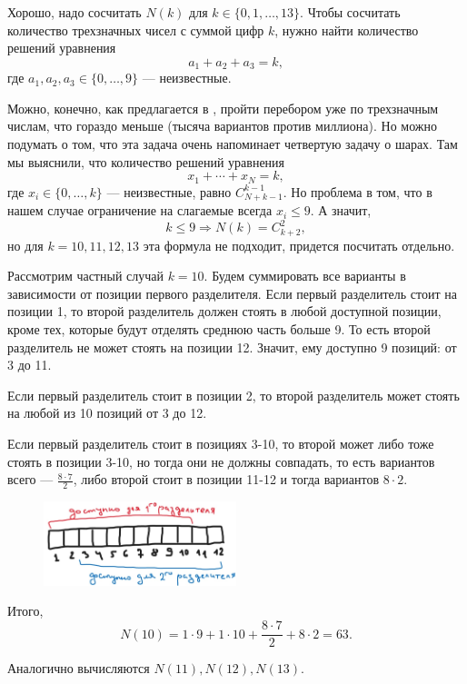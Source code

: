 \documentclass[a4paper,12pt]{article}
\renewcommand{\le}{\leqslant}
\newcounter{th-counter}
\begin{document}
Хорошо, надо сосчитать $N(k)$ для $k \in \{0, 1, \ldots, 13\}$. Чтобы сосчитать количество трехзначных чисел с суммой цифр $k$, нужно найти количество решений уравнения
\[
a_1 + a_2 + a_3 = k,
\]
где $a_1, a_2, a_3 \in \{0, \ldots, 9\}$ --- неизвестные.

Можно, конечно, как предлагается в \cite{OneMoreTimeAboutHappyTickets}, пройти перебором уже по трехзначным числам, что гораздо меньше (тысяча вариантов против миллиона). Но можно подумать о том, что эта задача очень напоминает четвертую задачу о шарах. Там мы выяснили, что количество решений уравнения
\[
x_1 + \cdots + x_N = k,
\]
где $x_i \in \{0, \ldots, k\}$ --- неизвестные, равно $C_{N+k-1}^{k-1}$. Но проблема в том, что в нашем случае ограничение на слагаемые всегда $x_i \le 9$. А значит, 
\[
k \le 9 \Rightarrow N(k) = C_{k+2}^2,
\]
но для $k = 10, 11, 12, 13$ эта формула не подходит, придется посчитать отдельно.

Рассмотрим частный случай $k = 10$. Будем суммировать все варианты в зависимости от позиции первого разделителя. Если первый разделитель стоит на позиции 1, то второй разделитель должен стоять в любой доступной позиции, кроме тех, которые будут отделять среднюю часть больше 9. То есть второй разделитель не может стоять на позиции 12. Значит, ему доступно 9 позиций: от 3 до 11.

Если первый разделитель стоит в позиции 2, то второй разделитель может стоять на любой из 10 позиций от 3 до 12.

Если первый разделитель стоит в позициях 3-10, то второй может либо тоже стоять в позиции 3-10, но тогда они не должны совпадать, то есть вариантов всего --- $\frac{8 \cdot 7}{2}$, либо второй стоит в позиции 11-12 и тогда вариантов $8 \cdot 2$.

\begin{figure}[h] %
    \centering
    \includegraphics[width=0.5\textwidth]{pictures/HappyTicketsFor10.jpg}
\end{figure}

Итого,
\[
N(10) = 1 \cdot 9 + 1 \cdot 10 + \frac{8 \cdot 7}{2} + 8 \cdot 2 = 63.
\]

Аналогично вычисляются $N(11), N(12), N(13)$.
\end{document}
